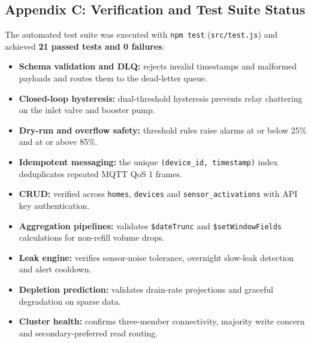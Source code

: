 \documentclass[11pt,a4paper]{article}
\begin{document}
\clearpage
\vspace*{0.1pt}
\subsection*{Appendix C: Verification and Test Suite Status}
{}

The automated test suite was executed with \texttt{npm test} (\texttt{src/test.js}) and achieved \textbf{21 passed tests and 0 failures}:
\begin{itemize}[noitemsep]
\item \textbf{Schema validation and DLQ:} rejects invalid timestamps and malformed payloads and routes them to the dead-letter queue.
\item \textbf{Closed-loop hysteresis:} dual-threshold hysteresis prevents relay chattering on the inlet valve and booster pump.
\item \textbf{Dry-run and overflow safety:} threshold rules raise alarms at or below 25\% and at or above 85\%.
\item \textbf{Idempotent messaging:} the unique \texttt{(device\_id, timestamp)} index deduplicates repeated MQTT QoS 1 frames.
\item \textbf{CRUD:} verified across \texttt{homes}, \texttt{devices} and \texttt{sensor\_activations} with API key authentication.
\item \textbf{Aggregation pipelines:} validates \texttt{\$dateTrunc} and \texttt{\$setWindowFields} calculations for non-refill volume drops.
\item \textbf{Leak engine:} verifies sensor-noise tolerance, overnight slow-leak detection and alert cooldown.
\item \textbf{Depletion prediction:} validates drain-rate projections and graceful degradation on sparse data.
\item \textbf{Cluster health:} confirms three-member connectivity, majority write concern and secondary-preferred read routing.
\end{itemize}
\end{document}
